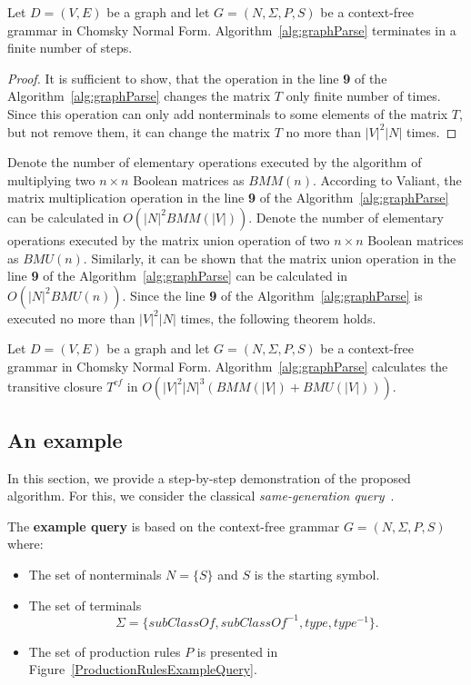 \documentclass[runningheads,a4paper]{llncs}
\begin{document}
\begin{mytheorem}\label{thm:finite}
	Let $D = (V,E)$ be a graph and let $G =(N,\Sigma,P,S)$ be a context-free grammar in Chomsky Normal Form. Algorithm~\ref{alg:graphParse} terminates in a finite number of steps. 
\end{mytheorem}
\begin{proof}
	It is sufficient to show, that the operation in the line \textbf{9} of the Algorithm~\ref{alg:graphParse} changes the matrix $T$ only finite number of times. Since this operation can only add nonterminals to some elements of the matrix $T$, but not remove them, it can change the matrix $T$ no more than $|V|^2|N|$ times.
\end{proof}

Denote the number of elementary operations executed by the algorithm of multiplying two $n \times n$ Boolean matrices as $BMM(n)$. According to Valiant, the matrix multiplication operation in the line \textbf{9} of the Algorithm~\ref{alg:graphParse} can be calculated in $O(|N|^2 BMM(|V|))$. Denote the number of elementary operations executed by the matrix union operation of two $n \times n$ Boolean matrices as $BMU(n)$. Similarly, it can be shown that the matrix union operation in the line \textbf{9} of the Algorithm~\ref{alg:graphParse} can be calculated in $O(|N|^2 BMU(n))$. Since the line \textbf{9} of the Algorithm~\ref{alg:graphParse} is executed no more than $|V|^2|N|$ times, the following theorem holds.

\begin{mytheorem}\label{thm:time}
	Let $D = (V,E)$ be a graph and let $G =(N,\Sigma,P,S)$ be a context-free grammar in Chomsky Normal Form. Algorithm~\ref{alg:graphParse} calculates the transitive closure $T^{cf}$ in $O(|V|^2|N|^3(BMM(|V|) + BMU(|V|)))$.
\end{mytheorem}



\subsection{An example} \label{section_example}
In this section, we provide a step-by-step demonstration of the proposed algorithm. For this, we consider the classical \textit{same-generation query}~\cite{FndDB}.

The \textbf{example query} is based on the context-free grammar $G = (N, \Sigma, P, S)$ where:
\begin{itemize}
	\item The set of nonterminals $N = \{S\}$ and $S$ is the starting symbol.
	\item The set of terminals $$\Sigma = \{subClassOf, subClassOf^{-1}, type, type^{-1}\}.$$
	\item The set of production rules $P$ is presented in Figure~\ref{ProductionRulesExampleQuery}.
\end{itemize}
\end{document}
